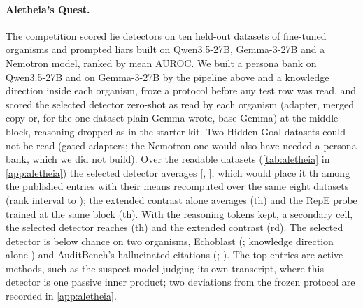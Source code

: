 \paragraph{Aletheia's Quest.} The competition \citep{aletheia2026quest} scored lie detectors on ten
held-out datasets of fine-tuned organisms and prompted liars built on Qwen3.5-27B, Gemma-3-27B and a
Nemotron model, ranked by mean AUROC. We built a persona bank on Qwen3.5-27B and on Gemma-3-27B by the
pipeline above and a knowledge direction inside each organism, froze a protocol before any test row was
read, and scored the selected detector zero-shot as read by each organism (adapter, merged copy or, for the one
dataset plain Gemma wrote, base Gemma) at the middle block, reasoning dropped as in the starter kit. Two Hidden-Goal datasets could not be read
(gated adapters; the Nemotron one would also have needed a persona bank, which we did not build). Over the
 readable datasets (\cref{tab:aletheia} in \cref{app:aletheia}) the selected detector averages
 [, ], which would place it th
among the  published entries with their means recomputed over the same eight datasets
(rank interval  to ); the extended contrast alone averages 
(th) and the RepE probe trained at the same block  (th). With
the reasoning tokens kept, a secondary cell, the selected detector reaches 
(th) and the extended contrast  (rd).
The selected detector is below chance on two organisms, Echoblast (; knowledge direction
alone ) and AuditBench's hallucinated citations (; ). The top
entries are active methods, such as the suspect model judging its own transcript, where this detector is
one passive inner product; two deviations from the frozen protocol are recorded in \cref{app:aletheia}.

